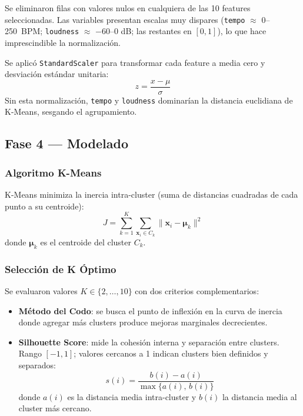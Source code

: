 \documentclass[12pt, a4paper]{article}
\begin{document}
Se eliminaron filas con valores nulos en cualquiera de las 10 features
seleccionadas. Las variables presentan escalas muy dispares
(\texttt{tempo} $\approx$ 0--250~BPM; \texttt{loudness} $\approx$
$-60$--0 dB; las restantes en $[0, 1]$), lo que hace imprescindible
la normalización.

Se aplicó \texttt{StandardScaler} para transformar cada feature a media
cero y desviación estándar unitaria:
\begin{equation}
z = \frac{x - \mu}{\sigma}
\end{equation}
Sin esta normalización, \texttt{tempo} y \texttt{loudness} dominarían la
distancia euclidiana de K-Means, sesgando el agrupamiento.

\subsection{Fase 4 — Modelado}

\subsubsection{Algoritmo K-Means}

K-Means minimiza la inercia intra-cluster (suma de distancias cuadradas
de cada punto a su centroide):
\begin{equation}
J = \sum_{k=1}^{K} \sum_{\mathbf{x}_i \in C_k}
    \|\mathbf{x}_i - \boldsymbol{\mu}_k\|^2
\end{equation}
donde $\boldsymbol{\mu}_k$ es el centroide del cluster $C_k$.

\subsubsection{Selección de K Óptimo}

Se evaluaron valores $K \in \{2, \ldots, 10\}$ con dos criterios
complementarios:

\begin{itemize}
  \item \textbf{Método del Codo}: se busca el punto de inflexión en la
        curva de inercia donde agregar más clusters produce mejoras
        marginales decrecientes.
  \item \textbf{Silhouette Score}: mide la cohesión interna y separación
        entre clusters. Rango $[-1, 1]$; valores cercanos a 1 indican
        clusters bien definidos y separados:
        \begin{equation}
          s(i) = \frac{b(i) - a(i)}{\max\{a(i),\, b(i)\}}
        \end{equation}
        donde $a(i)$ es la distancia media intra-cluster y $b(i)$ la
        distancia media al cluster más cercano.
\end{itemize}
\end{document}
